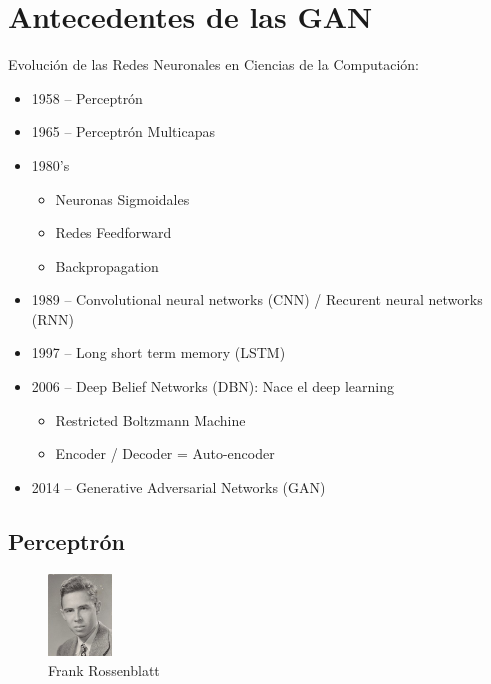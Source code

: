 \documentclass[a4paper]{article}
\begin{document}
\section{Antecedentes de las GAN}
Evolución de las Redes Neuronales en Ciencias de la Computación:
\begin{itemize}

    \item{1958 – Perceptrón}
    \item{1965 – Perceptrón Multicapas}
    \item{1980’s
    	\begin{itemize}
    	\item{Neuronas Sigmoidales}
        \item{Redes Feedforward}
        \item{Backpropagation}
        \end{itemize}
        }
    \item{1989 – Convolutional neural networks (CNN) / Recurent neural networks (RNN)}
    \item{1997 – Long short term memory (LSTM)}
    \item{2006 – Deep Belief Networks (DBN): Nace el deep learning}
    \begin{itemize}
    
        \item{Restricted Boltzmann Machine}
        \item{Encoder / Decoder = Auto-encoder}
        
    \end{itemize}
    \item{2014 – Generative Adversarial Networks (GAN)}

\end{itemize}

\newpage
\subsection{Perceptrón}
\begin{figure} %
    \centering
    \includegraphics[width=0.15\textwidth]{./images/220px-Rosenblatt_21.jpg}
    \caption{Frank Rossenblatt}
\end{figure}
\end{document}
